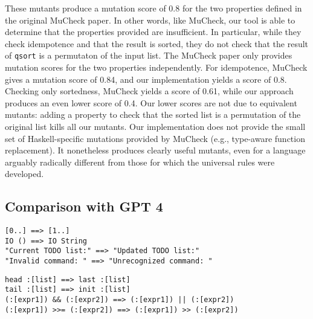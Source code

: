 \documentclass[acmsmall]{acmart}
\begin{document}
{These mutants produce a mutation
score of 0.8 for the two properties defined in the original MuCheck
paper.  In other words, like MuCheck, our tool is able to
determine that the properties provided are insufficient.  In
particular, while they check idempotence and that the result is
sorted, they do not check that the result of {\tt qsort} is a permutaton of the input
list.  The MuCheck paper only provides mutation scores for the two
properties independently.  For idempotence, MuCheck gives a mutation
score of 0.84, and our implementation yields a score of 0.8.  Checking
only sortedness, MuCheck yields a score of 0.61, while our approach
produces an even lower score of 0.4.  Our lower
scores are not due to equivalent mutants: adding a property to check
that the sorted list is a permutation of the original list kills all
our mutants.  Our implementation does not provide the small set of Haskell-specific
mutations provided by MuCheck (e.g., type-aware function replacement).  It nonetheless produces clearly useful
mutants, even for a language arguably radically different from those
for which the universal rules were developed. 

\subsection{Comparison with GPT 4}




\begin{lstlisting}[caption={\textbf{Example of GPT-4 Mutants for a Simple Haskell Program}},label=lst:haskellmutants]
[0..] ==> [1..]
IO () ==> IO String  
"Current TODO list:" ==> "Updated TODO list:"
"Invalid command: " ==> "Unrecognized command: "
\end{lstlisting}

\begin{lstlisting}[caption={\textbf{GPT-4 Comby Haskell Rules}},label=lst:haskellcomby]
head :[list] ==> last :[list]
tail :[list] ==> init :[list]
(:[expr1]) && (:[expr2]) ==> (:[expr1]) || (:[expr2])
(:[expr1]) >>= (:[expr2]) ==> (:[expr1]) >> (:[expr2])
\end{lstlisting}


}
\end{document}
